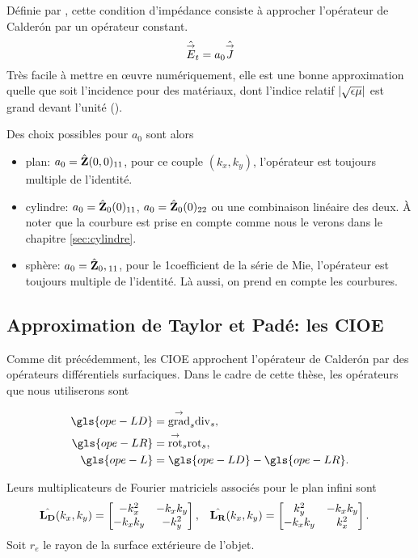     Définie par \cite{leontovich_investigations_1948}, cette condition d'impédance consiste à approcher l'opérateur de Calderón par un opérateur constant.
    \[
      \hat{{\overset{\rightarrow}{E}}}_t = a_0 \hat {{\overset{\rightarrow}{J}}}
    \]
    Très facile à mettre en œuvre numériquement, elle est une bonne approximation quelle que soit l'incidence pour des matériaux, dont l'indice relatif \(|\sqrt{\epsilon\mu}|\) est grand devant l'unité (\cite[par.~3, p.421-422]{senior_impedance_1960}).

    Des choix possibles pour \(a_0\) sont alors
    \begin{itemize}
      \item plan: \(a_0 = \hat{\mathbf{Z}}(0,0)_{11}\), pour ce couple \((k_x,k_y)\), l'opérateur est toujours multiple de l'identité.
      \item cylindre: \(a_0 = \hat{\mathbf{Z}}_0(0)_{11}\), \(a_0 = \hat{\mathbf{Z}}_0(0)_{22}\) ou une combinaison linéaire des deux. À noter que la courbure est prise en compte comme nous le verons dans le chapitre \ref{sec:cylindre}.
      \item sphère: \(a_0 = \hat{\mathbf{Z}}_0,{}_{11}\), pour le 1\ier coefficient de la série de Mie, l'opérateur est toujours multiple de l'identité. Là aussi, on prend en compte les courbures.
    \end{itemize}

  \subsection{Approximation de Taylor et Padé: les CIOE}

    Comme dit précédemment, les CIOE approchent l'opérateur de Calderón par des opérateurs différentiels surfaciques.
    Dans le cadre de cette thèse, les opérateurs que nous utiliserons sont

    \begin{align*}
      \gls{ope-LD} &= \tgrads \tdivs,
      \\
      \gls{ope-LR} &= \tvrots \trots,
      \\
      \gls{ope-L} &= \gls{ope-LD} - \gls{ope-LR}.
    \end{align*}

    Leurs multiplicateurs de Fourier matriciels associés pour le plan infini sont
    \begin{align*}
      \hat{\mathbf{L_D}}(k_x,k_y) &= \begin{bmatrix}-k_x^2 & -k_xk_y \\ -k_xk_y & -k_y^2\end{bmatrix}, &
      \hat{\mathbf{L_R}}(k_x,k_y) &= \begin{bmatrix}k_y^2 & -k_xk_y \\ -k_xk_y & k_x^2\end{bmatrix}.
    \end{align*}
    Soit \(r_e\) le rayon de la surface extérieure de l'objet.
      
